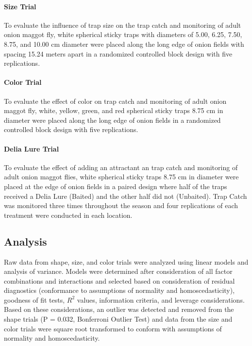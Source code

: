 \documentclass[alpha-refs]{wiley-article}
\begin{document}
\paragraph{Size Trial}
To evaluate the influence of trap size on the trap catch and monitoring of adult onion maggot fly, white spherical sticky traps with diameters of 5.00, 6.25, 7.50, 8.75, and 10.00 cm diameter were placed along the long edge of onion fields with spacing 15.24 meters apart in a randomized controlled block design with five replications.  

\paragraph{Color Trial}
To evaluate the effect of color on trap catch and monitoring of adult onion maggot fly, white, yellow, green, and red spherical sticky traps 8.75 cm in diameter were placed along the long edge of onion fields in a randomized controlled block design with five replications.  

\paragraph{Delia Lure Trial}
To evaluate the effect of adding an attractant an trap catch and monitoring of adult onion maggot flies, white spherical sticky traps 8.75 cm in diameter were placed at the edge of onion fields in a paired design where half of the traps received a Delia Lure (Baited) and the other half did not (Unbaited).  Trap Catch was monitored three times throughout the season and four replications of each treatment were conducted in each location.  


\subsection{Analysis}

Raw data from shape, size, and color trials were analyzed using linear models and analysis of variance.  Models were determined after consideration of all factor combinations and interactions and selected based on consideration of residual diagnostics (conformance to assumptions of normality and homoscedasticity), goodness of fit tests, $R^2$ values, information criteria, and leverage considerations. Based on these considerations, an outlier was detected and removed from the shape trials (P = 0.032, Bonferroni Outlier Test) and data from the size and color trials were square root transformed to conform with assumptions of normality and homoscedasticity.    
\end{document}
